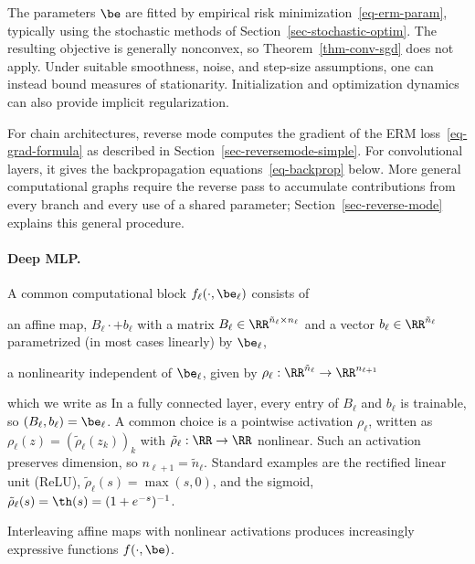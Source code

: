 The parameters $\be$ are fitted by empirical risk minimization~\eqref{eq-erm-param}, typically using the stochastic methods of Section~\ref{sec-stochastic-optim}. The resulting objective is generally nonconvex, so Theorem~\ref{thm-conv-sgd} does not apply. Under suitable smoothness, noise, and step-size assumptions, one can instead bound measures of stationarity. Initialization and optimization dynamics can also provide implicit regularization.

For chain architectures, reverse mode computes the gradient of the ERM loss~\eqref{eq-grad-formula} as described in Section~\ref{sec-reversemode-simple}. For convolutional layers, it gives the backpropagation equations~\eqref{eq-backprop} below. More general computational graphs require the reverse pass to accumulate contributions from every branch and every use of a shared parameter; Section~\ref{sec-reverse-mode} explains this general procedure.

\paragraph{Deep MLP.}

A common computational block $f_\ell(\cdot,\be_\ell)$ consists of
\begin{rs}
	\item an affine map, $B_\ell \cdot + b_\ell$ with a matrix $B_\ell \in \RR^{\tilde n_{\ell} \times n_\ell}$ and a vector $b_\ell \in \RR^{\tilde n_\ell}$ parametrized (in most cases linearly) by $\be_\ell$,
	\item a nonlinearity independent of $\be_\ell$, given by $\rho_\ell : \RR^{\tilde n_{\ell}} \rightarrow \RR^{n_{\ell+1}}$
\end{rs}
which we write as
In a fully connected layer, every entry of $B_\ell$ and $b_\ell$ is trainable, so $(B_\ell,b_\ell)=\be_\ell$.
%
A common choice is a pointwise activation $\rho_\ell$, written as $\rho_\ell(z)=(\tilde\rho_\ell(z_k))_k$ with $\tilde\rho_\ell : \RR \rightarrow \RR$ nonlinear. Such an activation preserves dimension, so $n_{\ell+1}=\tilde n_\ell$. Standard examples are the rectified linear unit (ReLU), $\tilde\rho_\ell(s)=\max(s,0)$, and the sigmoid, $\tilde\rho_\ell(s)=\th(s) = (1+e^{-s})^{-1}$.

Interleaving affine maps with nonlinear activations produces increasingly expressive functions $f(\cdot,\be)$.

